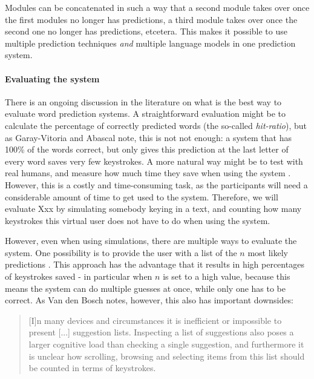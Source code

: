 \documentclass[11pt]{article}
\begin{document}
Modules can be concatenated in such a way that a second module takes over once the first modules no longer has predictions, a third module takes over once the second one no longer has predictions, etcetera. This makes it possible to use multiple prediction techniques \emph{and} multiple language models in one prediction system.

\paragraph{Evaluating the system} \label{evaluation}

There is an ongoing discussion in the literature on what is the best way to evaluate word prediction systems. A straightforward evaluation might be to calculate the percentage of correctly predicted words (the so-called \emph{hit-ratio}), but as Garay-Vitoria and Abascal  note, this is not not enough: a system that has 100\% of the words correct, but only gives this prediction at the last letter of every word saves very few keystrokes. A more natural way might be to test with real humans, and measure how much time they save when using the system \cite{carlberger+97,koester+98,Garay-Vitoria+06}. However, this is a costly and time-consuming task, as the participants will need a considerable amount of time to get used to the system. Therefore, we will evaluate Xxx by simulating somebody keying in a text, and counting how many keystrokes this virtual user does not have to do when using the system. 

However, even when using simulations, there are multiple ways to evaluate the system. One possibility is to provide the user with a list of the $n$ most likely predictions \cite{Lesher+99,Fazly+03}. This approach has the advantage that it results in high percentages of keystrokes saved - in particular when $n$ is set to a high value, because this means the system can do multiple guesses at once, while only one has to be correct. As Van den Bosch  notes, however, this also has important downsides: 

\begin{quotation}
[I]n many devices and circumstances it is inefficient or impossible to present [...] suggestion lists. Inspecting a list of suggestions also poses a larger cognitive load than checking a single suggestion, and furthermore it is unclear how scrolling, browsing and selecting items from this list should be counted in terms of keystrokes.
\end{quotation}
\end{document}
